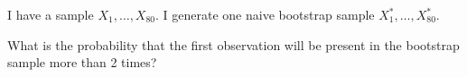 
\begin{question}
I have a sample \(X_1, \ldots, X_{80}\).
I generate one naive bootstrap sample \(X^*_1, \ldots, X^*_{80}\).

What is the probability that the first observation will be present in the bootstrap sample more than 2 times?

\end{question}


